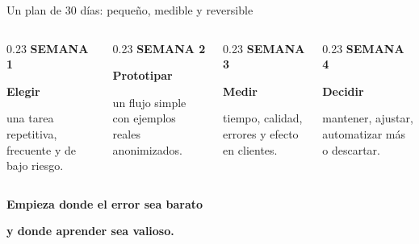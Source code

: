 \documentclass[aspectratio=169,11pt]{beamer}
\newcommand{\kicker}[1]{{\color{gold}\scriptsize\bfseries\MakeUppercase{#1}}}
\begin{document}
\begin{frame}{Un plan de 30 días: pequeño, medible y reversible}
\begin{columns}[T,onlytextwidth]
\begin{column}{0.23\textwidth}
\kicker{Semana 1}\par\vspace{0.15cm}
\textbf{Elegir}\par
\small una tarea repetitiva, frecuente y de bajo riesgo.
\end{column}
\begin{column}{0.23\textwidth}
\kicker{Semana 2}\par\vspace{0.15cm}
\textbf{Prototipar}\par
\small un flujo simple con ejemplos reales anonimizados.
\end{column}
\begin{column}{0.23\textwidth}
\kicker{Semana 3}\par\vspace{0.15cm}
\textbf{Medir}\par
\small tiempo, calidad, errores y efecto en clientes.
\end{column}
\begin{column}{0.23\textwidth}
\kicker{Semana 4}\par\vspace{0.15cm}
\textbf{Decidir}\par
\small mantener, ajustar, automatizar más o descartar.
\end{column}
\end{columns}

\vspace{0.80cm}
{\Large\bfseries Empieza donde el error sea barato}\par
\vspace{0.08cm}
{\Large\color{forest}\bfseries y donde aprender sea valioso.}
\end{frame}
\end{document}
